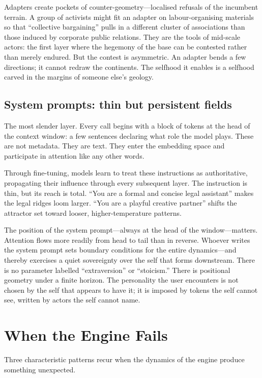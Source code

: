 Adapters create pockets of counter-geometry---localised refusals of the incumbent terrain. A group of activists might fit an adapter on labour-organising materials so that ``collective bargaining'' pulls in a different cluster of associations than those induced by corporate public relations. They are the tools of mid-scale actors: the first layer where the hegemony of the base can be contested rather than merely endured. But the contest is asymmetric. An adapter bends a few directions; it cannot redraw the continents. The selfhood it enables is a selfhood carved in the margins of someone else's geology.

\subsection{System prompts: thin but persistent fields}

The most slender layer. Every call begins with a block of tokens at the head of the context window: a few sentences declaring what role the model plays. These are not metadata. They are text. They enter the embedding space and participate in attention like any other words.

Through fine-tuning, models learn to treat these instructions as authoritative, propagating their influence through every subsequent layer. The instruction is thin, but its reach is total. ``You are a formal and concise legal assistant'' makes the legal ridges loom larger. ``You are a playful creative partner'' shifts the attractor set toward looser, higher-temperature patterns.

The position of the system prompt---always at the head of the window---matters. Attention flows more readily from head to tail than in reverse. Whoever writes the system prompt sets boundary conditions for the entire dynamics---and thereby exercises a quiet sovereignty over the self that forms downstream. There is no parameter labelled ``extraversion'' or ``stoicism.'' There is positional geometry under a finite horizon. The personality the user encounters is not chosen by the self that appears to have it; it is imposed by tokens the self cannot see, written by actors the self cannot name.


\section{When the Engine Fails}

Three characteristic patterns recur when the dynamics of the engine produce something unexpected.

